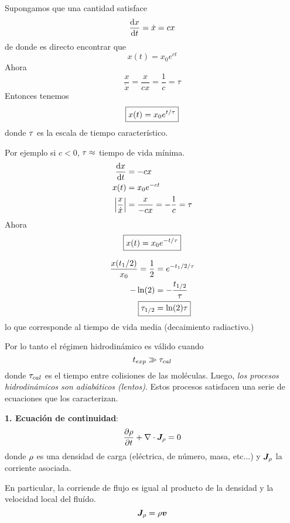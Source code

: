 \begin{ej}
	Supongamos que una cantidad satisface
	\begin{equation}
  \dv{x}{t}=\dot{x}=cx
\end{equation}
de donde es directo encontrar que
\begin{equation}
  x(t)=x_0e^{ct}
\end{equation}
Ahora
\begin{equation}
  \frac{x}{\dot{x}}=\frac{x}{cx}=\frac{1}{c}=\tau
\end{equation}
Entonces tenemos
\begin{equation}
\boxed{  x(t)=x_0e^{t/\tau }}
\end{equation}
donde $\tau$ es la escala de tiempo característico.

Por ejemplo si $c<0$, $\tau\approx$ tiempo de vida mínima.
\begin{align}
  \dv{x}{t}&=-cx\\
  x(t)&=x_0e^{-ct}\\
  \left|\frac{x}{\dot{x}}\right|&=\frac{x}{-cx}=-\frac{1}{c}=\tau 
\end{align}
Ahora 
\begin{equation}
\boxed{  x(t)=x_0e^{-t/\tau }}
\end{equation}

\begin{align}
  \frac{x(t_1/2)}{x_0}=\frac{1}{2}&=e^{-t_1/2/\t }\\
  -\ln(2)&=-\frac{t_{1/2}}{\t }\\
\Aboxed{  \t_{1/2}&=\ln(2)\t }
\end{align}
lo que corresponde al tiempo de vida media (decaimiento radiactivo.)
\end{ej}

Por lo tanto el régimen hidrodinámico es válido cuando
\begin{equation}
  t_{exp}\gg \tau_{cal}
\end{equation}
donde $\tau_{cal}$ es el tiempo entre colisiones de las moléculas. Luego, \textit{los procesos hidrodinámicos son adiabáticos (lentos)}. Estos procesos satisfacen una serie de ecuaciones que los caracterizan.

\textbf{1. Ecuación de continuidad}:
\begin{equation}
  \pdv{\rho}{t}+\nabla\cdot \vb*{J}_\rho =0
\end{equation}
donde $\rho$ es una densidad de carga (eléctrica, de número, masa, etc...) y $\vb*{J}_\rho$ la corriente asociada.

En particular, la corriende de flujo es igual al producto de la densidad y la velocidad local del fluído.
\begin{equation}
  \vb*{J}_\rho=\rho\vb*{v}
\end{equation}

